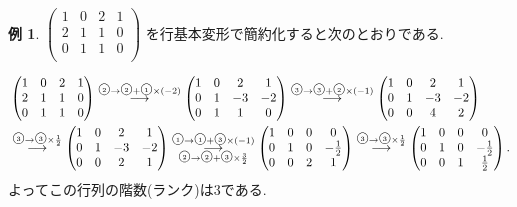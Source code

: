 \documentclass[dvipdfmx,a4paper,11pt]{article} %
\newcommand{\maru}[1]{\raise0.2ex\hbox{\textcircled{\tiny{#1}}}}
\theoremstyle{definition}
\newtheorem{exa}[thm]{例}
\begin{document}
\begin{exa}
$
 \begin{pmatrix}
 1& 0& 2  &1\\
 2& 1& 1  &0\\
 0& 1& 1  &0\\
 \end{pmatrix}
 $
 を行基本変形で簡約化すると次のとおりである.
 
 \begin{align*}
 &\begin{pmatrix}
 1& 0& 2  &1\\
 2& 1& 1  &0\\
 0& 1& 1  &0\\
 \end{pmatrix}
\overset{\maru{2} \to \maru{2} + \maru{1}\times(-2)}{\longrightarrow}  \begin{pmatrix}
 1& 0& 2  &1\\
 0& 1& -3 &-2\\
 0& 1& 1  &0\\
 \end{pmatrix}
\overset{\maru{3} \to \maru{3} + \maru{2}\times(-1)}{\longrightarrow} 
\begin{pmatrix}
 1& 0& 2  &1\\
 0& 1& -3 &-2\\
 0& 0& 4  &2\\
 \end{pmatrix}
 \\ %
 & \overset{\maru{3} \to \maru{3}\times \frac{1}{2}}{\longrightarrow} 
\begin{pmatrix}
 1& 0& 2  &1\\
 0& 1& -3 &-2\\
 0& 0& 2  &1\\
 \end{pmatrix} 
\overset{\maru{1}\to\maru{1} + \maru{3}\times (-1)}{\underset{\maru{2} \to \maru{2} + \maru{3}\times \frac{3}{2}}{\longrightarrow}}
 \begin{pmatrix}
 1& 0& 0  &0\\
 0& 1& 0 &-\frac{1}{2}\\
 0& 0& 2  &1\\
 \end{pmatrix} 
 \overset{\maru{3} \to \maru{3}\times \frac{1}{2}}{\longrightarrow} 
  \begin{pmatrix}
 1& 0& 0  &0\\
 0& 1& 0 &-\frac{1}{2}\\
 0& 0& 1 &\frac{1}{2}\\
 \end{pmatrix}.
 \end{align*}
   よってこの行列の階数(ランク)は3である.
 \end{exa}
 
\end{document}
